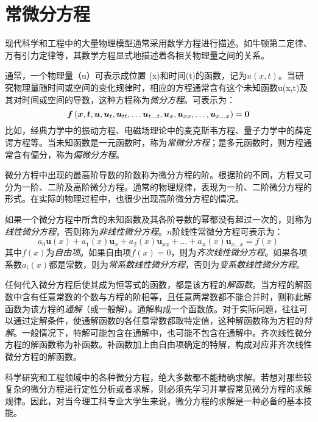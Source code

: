 \chapter{常微分方程}

现代科学和工程中的大量物理模型通常采用数学方程进行描述。如牛顿第二定律、万有引力定律等，其数学方程显式地描述着各相关物理量之间的关系。

通常，一个物理量（u）可表示成位置 (x)和时间(t)的函数，记为$u(x,t)$。当研究物理量随时间或空间的变化规律时，相应的方程通常含有这个未知函数u(x,t)及其对时间或空间的导数，这种方程称为\emph{微分方程}。可表示为：
\begin{equation}
	\boldsymbol{f}\left(\boldsymbol{x}, \boldsymbol{t}, \boldsymbol{u}, \boldsymbol{u}_{t}, \boldsymbol{u}_{t t}, \ldots \boldsymbol{u}_{t \ldots t}, \boldsymbol{u}_{x}, \boldsymbol{u}_{x x}, \ldots, \boldsymbol{u}_{x \ldots x}\right)=\mathbf{0} \\
 \end{equation}
比如，经典力学中的振动方程、电磁场理论中的麦克斯韦方程、量子力学中的薛定谔方程等。当未知函数是一元函数时，称为\emph{常微分方程}；是多元函数时，则方程通常含有偏分，称为\emph{偏微分方程}。

微分方程中出现的最高阶导数的阶数称为微分方程的阶。根据阶的不同，方程又可分为一阶、二阶及高阶微分方程。通常的物理规律，表现为一阶、二阶微分方程的形式。在实际的物理过程中，也很少出现高阶微分方程的情况。

如果一个微分方程中所含的未知函数及其各阶导数的幂都没有超过一次的，则称为
\emph{线性微分方程}，否则称为\emph{非线性微分方程}。$n$阶线性常微分方程可表示为：
\begin{equation}
	a_0\boldsymbol{u}(x) + a_1 (x)\boldsymbol{u}_{x} +a_2 (x) \boldsymbol{u}_{x x}+ \ldots+ a_n(x)\boldsymbol{u}_{x \ldots x}=f(x)
 \end{equation}
其中$f(x)$为\emph{自由项}。如果自由项$f(x)=0$，则为\emph{齐次线性微分方程}。如果各项系数$a_i (x)$都是常数，则为\emph{常系数线性微分方程}，否则为\emph{变系数线性微分方程}。 

任何代入微分方程后使其成为恒等式的函数，都是该方程的\emph{解函数}。当方程的解函数中含有任意常数的个数与方程的阶相等，且任意两常数都不能合并时，则称此解函数为该方程的\emph{通解}（或一般解）。通解构成一个函数族。对于实际问题，往往可以通过定解条件，使通解函数的各任意常数都取特定值，这种解函数称为方程的\emph{特解}。一般情况下，特解可能包含在通解中，也可能不包含在通解中。齐次线性微分方程的解函数称为补函数。补函数加上由自由项确定的特解，构成对应非齐次线性微分方程的解函数。

科学研究和工程领域中的各种微分方程，绝大多数都不能精确求解。若想对那些较复杂的微分方程进行定性分析或者求解，则必须先学习并掌握常见微分方程的求解规律。因此，对当今理工科专业大学生来说，微分方程的求解是一种必备的基本技能。

